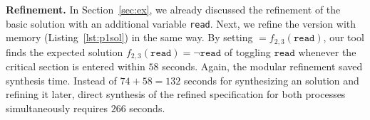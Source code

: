 \textbf{Refinement.}
In Section~\ref{sec:ex}, we already discussed the refinement of the basic \ags 
solution with an additional variable \texttt{read}. Next, we refine the version 
with memory (Listing~\ref{lst:p1sol}) in the same way. By setting 
$=f_{2,3}(\texttt{read})$, our tool finds the expected 
solution $f_{2,3}(\texttt{read}) = \neg \texttt{read}$ of toggling 
$\texttt{read}$ whenever the critical section is entered within $58$ seconds. Again, the modular refinement saved synthesis time.  Instead of $74+58 = 132$ 
seconds for synthesizing an \ags solution and refining it later, direct 
synthesis of the refined specification for both processes simultaneously 
requires $266$ seconds.





